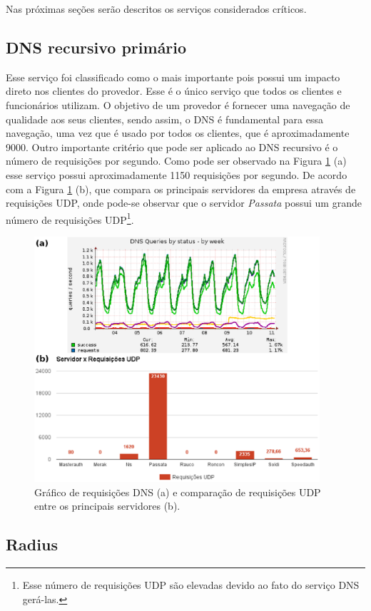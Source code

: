 Nas próximas seções serão descritos os serviços considerados críticos.

\subsection{\ac{DNS} recursivo primário}
\label{section:dnsrecprim}

Esse serviço foi classificado como o mais importante pois possui um impacto direto nos clientes do provedor. Esse é o único serviço que todos 
os clientes e funcionários utilizam. O objetivo de um provedor é fornecer uma navegação de qualidade aos seus clientes, sendo assim, o \ac{DNS} 
é fundamental para essa navegação, uma vez que é usado por todos os clientes, que é aproximadamente 9000. Outro importante critério que pode ser 
aplicado ao \ac{DNS} recursivo é o número de requisições por segundo. Como pode ser observado na Figura \ref{fig:dns_udp} (a) esse serviço
possui aproximadamente 1150 requisições por segundo. De acordo com a Figura \ref{fig:dns_udp} (b), que compara os principais servidores da 
empresa através de requisições \ac{UDP}, onde pode-se observar que o servidor \textit{Passata} possui um grande número de requisições 
\ac{UDP}\footnote[1]{Esse número de requisições \ac{UDP} são elevadas devido ao fato do serviço \ac{DNS} gerá-las.}.

\begin{figure}[h!]
 \centering
 \includegraphics[width=400px]{img/dns_udp.eps}
 \caption{Gráfico de requisições DNS (a) e comparação de requisições UDP entre os principais servidores (b).}
 \label{fig:dns_udp}
\end{figure}

\subsection{Radius}
\label{section:radius}

